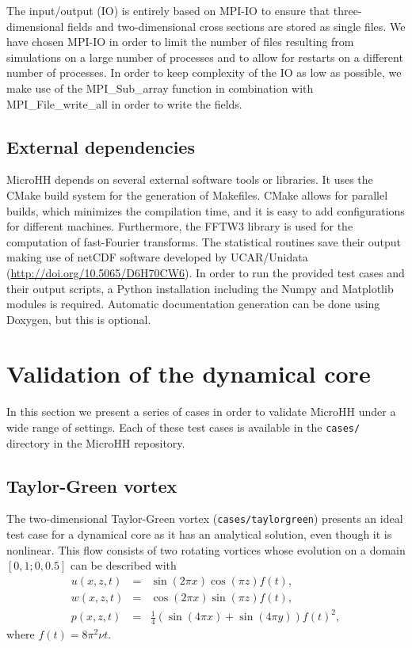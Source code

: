 \documentclass[gmd]{copernicus}
\begin{document}
The input/output (IO) is entirely based on MPI-IO to ensure that three-dimensional fields and two-dimensional cross sections are stored as single files. We have chosen MPI-IO in order to limit the number of files resulting from simulations on a large number of processes and to allow for restarts on a different number of processes. In order to keep complexity of the IO as low as possible, we make use of the MPI\_Sub\_array function in combination with MPI\_File\_write\_all in order to write the fields.

\subsection{External dependencies}
MicroHH depends on several external software tools or libraries. It uses the CMake build system for the generation of Makefiles. CMake allows for parallel builds, which minimizes the compilation time, and it is easy to add configurations for different machines. Furthermore, the FFTW3 library \citep{Frigo2005} is used for the computation of fast-Fourier transforms. The statistical routines save their output making use of netCDF software developed by UCAR/Unidata (\url{http://doi.org/10.5065/D6H70CW6}). In order to run the provided test cases and their output scripts, a Python installation including the Numpy and Matplotlib modules is required. Automatic documentation generation can be done using Doxygen, but this is optional.

\section{Validation of the dynamical core} \label{sec:tests}
In this section we present a series of cases in order to validate MicroHH under a wide range of settings. Each of these test cases is available in the \texttt{cases/} directory in the MicroHH repository.

\subsection{Taylor-Green vortex}
The two-dimensional Taylor-Green vortex (\texttt{cases/taylorgreen}) presents an ideal test case for a dynamical core as it has an analytical solution, even though it is nonlinear. This flow consists of two rotating vortices whose evolution on a domain $\left[0,1; 0,0.5 \right]$ can be described with
\begin{eqnarray}
u(x,z,t) & = & \sin(2\pi x) \cos(\pi z) f(t),\\
w(x,z,t) & = & \cos(2\pi x) \sin(\pi z) f(t),\\
p(x,z,t) & = & \tfrac{1}{4} \left(\sin(4 \pi x) + \sin(4 \pi y) \right) f(t)^2,
\end{eqnarray}
where $f(t) = 8 \pi^2 \nu t$.
\end{document}
